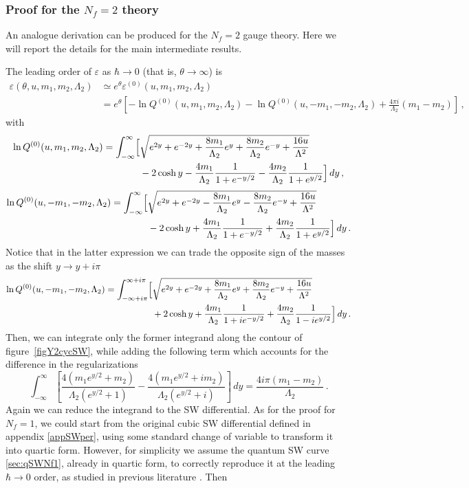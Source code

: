\documentclass[11pt,a4paper]{elsarticle}
\def \th {\theta}
\def \ba {\begin{aligned}}
\def \ea {\end{aligned}}
\newcommand{\be}{\begin{equation}}
\newcommand{\ee}{\end{equation}}
\def\th{\theta}
\numberwithin{figure}{section}
\numberwithin{table}{section}
\begin{document}
\subsubsection{Proof for the $N_f=2$ theory}

An analogue derivation can be produced for the $N_f=2$ gauge theory. Here we will report the details for the main intermediate results. 

The leading order of $\varepsilon$ as $\hbar \to 0$ (that is, $\theta\to \infty$) is
\be 
\ba
\varepsilon(\th,u,m_1,m_2,\Lambda_2) &\simeq e^\th \varepsilon^{(0)}(u,m_1,m_2,\Lambda_2) \\
&= e^\th  \left[-\ln Q^{(0)}(u,m_1,m_2,\Lambda_2) -\ln Q^{(0)}(u,-m_1,-m_2,\Lambda_2) +\frac{4  \pi i}{\Lambda_2} (m_1-m_2)\right]\,,
\ea
\ee 
with
\be 
\ba
\ln Q^{(0)}(u,m_1,m_2,\Lambda_2)= \int_{-\infty}^\infty \Bigl[&\sqrt{e^{2y}+e^{-2y}+ \frac{8m_1}{\Lambda_2} e^y+\frac{8m_2}{\Lambda_2}e^{-y} + \frac{16 u}{\Lambda^2}} \\ 
&-2\cosh y- \frac{4m_1}{\Lambda_2}\frac{1}{1+e^{-y/2}} - \frac{4m_2}{\Lambda_2}\frac{1}{1+e^{y/2}} \Bigr]\, d y\,,
\ea
\ee
\be
\ba
\ln Q^{(0)}(u,-m_1,-m_2,\Lambda_2)= \int_{-\infty}^\infty \Bigl[&\sqrt{e^{2y}+e^{-2y}- \frac{8m_1}{\Lambda_2} e^y-\frac{8m_2}{\Lambda_2}e^{-y} + \frac{16 u}{\Lambda^2}} \\ 
&-2\cosh y+ \frac{4m_1}{\Lambda_2}\frac{1}{1+e^{-y/2}} + \frac{4m_2}{\Lambda_2}\frac{1}{1+e^{y/2}} \Bigr]\, d y \,.
\ea
\ee 
Notice that in the latter expression we can trade the opposite sign of the masses as the shift $y \to y+i \pi$
\be 
\ba
\ln Q^{(0)}(u,-m_1,-m_2,\Lambda_2)= \int_{-\infty+i\pi}^{\infty+i\pi} \Bigl[&\sqrt{e^{2y}+e^{-2y}+ \frac{8m_1}{\Lambda_2} e^y+\frac{8m_2}{\Lambda_2}e^{-y} + \frac{16 u}{\Lambda^2}} \\ 
&+2\cosh y+ \frac{4m_1}{\Lambda_2}\frac{1}{1+i e^{-y/2}} + \frac{4m_2}{\Lambda_2}\frac{1}{1-i e^{y/2}} \Bigr]\, d y \,.
\ea
\ee
Then, we can integrate only the former integrand along the contour of figure~\ref{figY2cycSW}, while adding the following term which accounts for the difference in the regularizations
\be 
\int_{-\infty}^{\infty}\left[\frac{4 \left(m_1e^{y/2}+m_2\right)}{\Lambda_2 \left(e^{y/2}+1\right)}-\frac{4 \left(m_1e^{y/2}+i m_2\right)}{\Lambda_2 \left(e^{y/2}+i\right)}\right] \, dy=\frac{4 i \pi  (m_1-m_2)}{\Lambda_2}\,.
\ee 
Again we can reduce the integrand to the SW differential. As for the proof for $N_f=1$, we could start from the original cubic SW differential defined in appendix \ref{appSWper}, using some standard change of variable to transform it into quartic form. However, for simplicity we assume the quantum SW curve \eqref{sec:qSWNf1}, already in quartic form, to correctly reproduce it at the leading $\hbar \to 0$ order, as studied in previous literature \cite{ItoKannoOkubo:2017}. Then%
\end{document}
